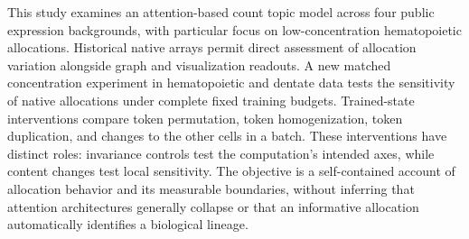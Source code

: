 This study examines an attention-based count topic model across four public expression backgrounds, with particular focus on low-concentration hematopoietic allocations. Historical native arrays permit direct assessment of allocation variation alongside graph and visualization readouts. A new matched concentration experiment in hematopoietic and dentate data tests the sensitivity of native allocations under complete fixed training budgets. Trained-state interventions compare token permutation, token homogenization, token duplication, and changes to the other cells in a batch. These interventions have distinct roles: invariance controls test the computation's intended axes, while content changes test local sensitivity. The objective is a self-contained account of allocation behavior and its measurable boundaries, without inferring that attention architectures generally collapse or that an informative allocation automatically identifies a biological lineage.
